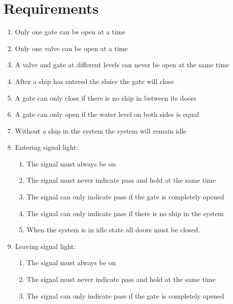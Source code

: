 \section{Requirements}
\begin{enumerate}
	\item Only one gate can be open at a time
	\item Only one valve can be open at a time
	\item A valve and gate at different levels can never be open at the same time
	\item After a ship has entered the sluice the gate will close
	\item A gate can only close if there is no ship in between its doors
	\item A gate can only open if the water level on both sides is equal
	\item Without a ship in the system the system will remain idle
	
	\item Entering signal light:
		\begin{enumerate}
			\item The signal must always be on
			\item The signal must never indicate pass and hold at the same time
			\item The signal can only indicate pass if the gate is completely opened
			\item The signal can only indicate pass if there is no ship in the system
			\item When the system is in idle state all doors must be closed.
			
		\end{enumerate}
	\item Leaving signal light:
		\begin{enumerate}
			\item The signal must always be on
			\item The signal must never indicate pass and hold at the same time
			\item The signal can only indicate pass if the gate is completely opened
		\end{enumerate}
\end{enumerate}
